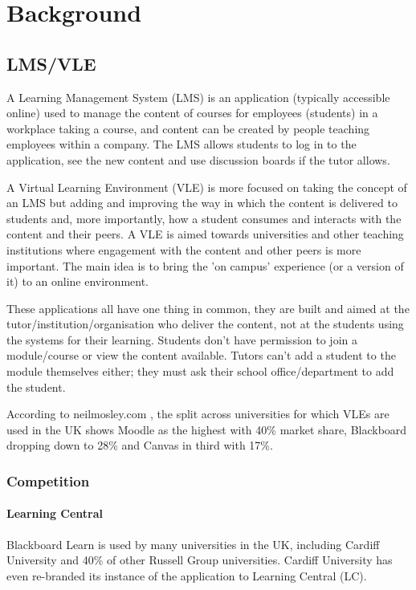 \chapter{Background}

\section{LMS/VLE}
A Learning Management System (LMS) is an application (typically accessible online) used to manage the content of courses for employees (students) in a workplace taking a course, and content can be created by people teaching employees within a company. The LMS allows students to log in to the application, see the new content and use discussion boards if the tutor allows.

A Virtual Learning Environment (VLE) is more focused on taking the concept of an LMS but adding and improving the way in which the content is delivered to students and, more importantly, how a student consumes and interacts with the content and their peers. A VLE is aimed towards universities and other teaching institutions where engagement with the content and other peers is more important. The main idea is to bring the 'on campus' experience (or a version of it) to an online environment.

These applications all have one thing in common, they are built and aimed at the tutor/institution/organisation who deliver the content, not at the students using the systems for their learning. Students don't have permission to join a module/course or view the content available. Tutors can't add a student to the module themselves either; they must ask their school office/department to add the student.

According to neilmosley.com \cite{neilmosley_VLEs}, the split across universities for which VLEs are used in the UK shows Moodle as the highest with 40\% market share, Blackboard dropping down to 28\% and Canvas in third with 17\%.

\subsection{Competition}

\subsubsection{Learning Central}

Blackboard Learn \cite{blackboard_learn} is used by many universities in the UK, including Cardiff University and 40\% of other Russell Group universities\cite{neilmosley_VLEs}. Cardiff University has even re-branded its instance of the application to Learning Central (LC).

